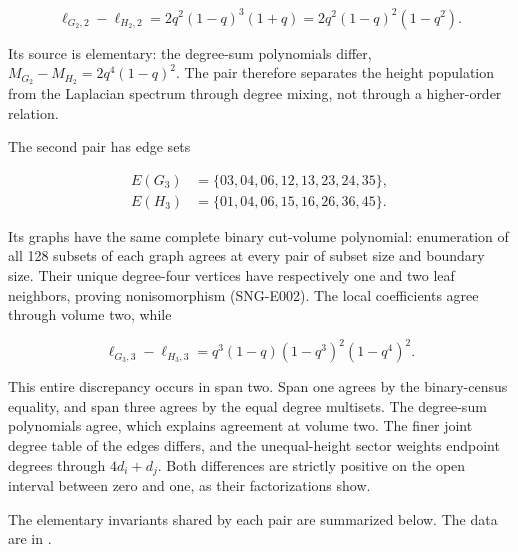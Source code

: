 \documentclass[
  11pt,
  a4paper,
]{article}
\let\singularitytexttt\texttt
\renewcommand{\texttt}[1]{\singularitytexttt{\seqsplit{#1}}}
\begin{document}
\[
 \ell_{G_2,2}-\ell_{H_2,2}=2q^2(1-q)^3(1+q)=2q^2(1-q)^2(1-q^2).
\]

Its source is elementary: the degree-sum polynomials differ,
\(M_{G_2}-M_{H_2}=2q^4(1-q)^2\). The pair therefore separates the height
population from the Laplacian spectrum through degree mixing, not
through a higher-order relation.

The second pair has edge sets

\[
 \begin{aligned}
 E(G_3)&=\{03,04,06,12,13,23,24,35\},\\
 E(H_3)&=\{01,04,06,15,16,26,36,45\}.
 \end{aligned}
\]

Its graphs have the same complete binary cut-volume polynomial:
enumeration of all 128 subsets of each graph agrees at every pair of
subset size and boundary size. Their unique degree-four vertices have
respectively one and two leaf neighbors, proving nonisomorphism
(SNG-E002). The local coefficients agree through volume two, while

\[
 \ell_{G_3,3}-\ell_{H_3,3}
 =q^3(1-q)(1-q^3)^2(1-q^4)^2.
\]

This entire discrepancy occurs in span two. Span one agrees by the
binary-census equality, and span three agrees by the equal degree
multisets. The degree-sum polynomials agree, which explains agreement at
volume two. The finer joint degree table of the edges differs, and the
unequal-height sector weights endpoint degrees through \(4d_i+d_j\).
Both differences are strictly positive on the open interval between zero
and one, as their factorizations show.

The elementary invariants shared by each pair are summarized below. The
data are in \texttt{results/exact\_examples.json}.
\end{document}
